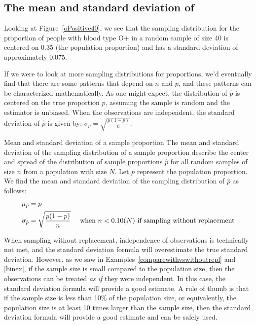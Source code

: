 \newpage

\subsection[The mean and standard deviation of $\hat{p}$]{The mean and standard deviation of }
\label{meansdphat}

Looking at Figure~\ref{oPositive40}, we see that the sampling distribution for the proportion of people with blood type O+ in a random sample of size 40 is centered on 0.35 (the population proportion) and has a standard deviation of approximately 0.075.  

If we were to look at more sampling distributions for proportions, we'd eventually find that there are some patterns that depend on $n$ and $p$, and these patterns can be characterized mathematically.  As one might expect, the distribution of $\hat{p}$ is centered on the true proportion $p$, assuming the sample is random and the estimator is unbiased.  When the observations are independent, the standard deviation of $\hat{p}$ is given by: $\sigma_{\hat{p}} = \sqrt{\frac{p(1-p)}{n}}$.

\begin{onebox}{Mean and standard deviation of a sample proportion}
The mean and standard deviation of the sampling distribution of a sample proportion describe the center and spread of the distribution of sample proportions $\hat{p}$ for all random samples of size $n$ from a population with size $N$.  Let $p$ represent the population proportion.  We find the mean and standard deviation of the sampling distribution of $\hat{p}$ as follows:  
\begin{align*}
\mu_{\hat{p}} &= p \\
 \sigma_{\hat{p}} &= \sqrt{\frac{p(1-p)}{n}} \quad \text{ when } n<0.10(N) \text{ if sampling without replacement}
 	\vspace{1mm}
\end{align*}
\end{onebox}

When sampling without replacement, independence of observations is technically not met, and the standard deviation formula will overestimate the true standard deviation.  However, as we saw in Examples~\ref{comparewithvswithoutrepl} and \ref{binex}, if the sample size is small compared to the population size, then the observations can be treated \emph{as if} they were independent.  In this case, the standard deviation formula will provide a good estimate.  A rule of thumb is that if the sample size is less than 10\% of the population size, or equivalently, the population size is at least 10 times larger than the sample size, then the standard deviation formula will provide a good estimate and can be safely used.

